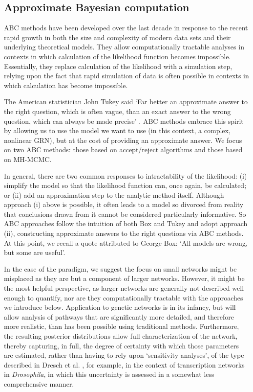 \subsection{Approximate Bayesian computation}
ABC methods have been developed over the last decade in response to the recent rapid growth in both the size and complexity of modern data sets and their underlying theoretical models. They allow computationally tractable analyses in contexts in which calculation of the likelihood function becomes impossible. Essentially, they replace calculation of the likelihood with a simulation step, relying upon the fact that rapid simulation of data is often possible in contexts in which calculation has become impossible.

The American statistician John Tukey said `Far better an approximate answer to the right question, which is often vague, than an exact answer to the wrong question, which can always be made precise' \cite{Tukey1962}. ABC methods embrace this spirit by allowing us to use the model we want to use (in this context, a complex, nonlinear GRN), but at the cost of providing an approximate answer. We focus on two ABC methods: those based on accept/reject algorithms and those based on MH-MCMC.

In general, there are two common responses to intractability of the likelihood: (i) simplify the model so that the likelihood function can, once again, be calculated; or (ii) add an approximation step to the analytic method itself. Although approach (i) above is possible, it often leads to a model so divorced from reality that conclusions drawn from it cannot be considered particularly informative. So ABC approaches follow the intuition of both Box and Tukey and adopt approach (ii), constructing approximate answers to the right questions via ABC methods. At this point, we recall a quote attributed to George Box: ‘All models are wrong, but some are useful’.

In the case of the paradigm, we suggest the focus on small networks might be misplaced as they are but a component of larger networks. However, it might be the most helpful perspective, as larger networks are generally not described well enough to quantify, nor are they computationally tractable with the approaches we introduce below. Application to genetic networks is in its infancy, but will allow analysis of pathways that are significantly more detailed, and therefore more realistic, than has been possible using traditional methods. Furthermore, the resulting posterior distributions allow full characterization of the network, thereby capturing, in full, the degree of certainty with which those parameters are estimated, rather than having to rely upon ‘sensitivity analyses’, of the type described in Dresch et al. \cite{Dresch2010}, for example, in the context of transcription networks in \emph{Drosophila}, in which this uncertainty is assessed in a somewhat less comprehensive manner.

